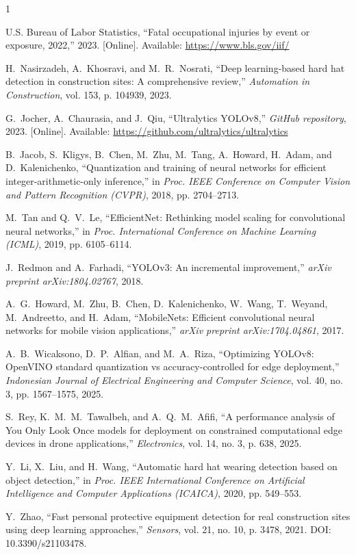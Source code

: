 \documentclass[conference,a4paper]{IEEEtran}
\begin{document}
\begin{thebibliography}{1}

U.S. Bureau of Labor Statistics, ``Fatal occupational injuries by event or exposure, 2022,'' 2023. [Online]. Available: \url{https://www.bls.gov/iif/}

H.~Nasirzadeh, A.~Khosravi, and M.~R.~Nosrati, ``Deep learning-based hard hat detection in construction sites: A comprehensive review,'' \emph{Automation in Construction}, vol. 153, p. 104939, 2023.

G.~Jocher, A.~Chaurasia, and J.~Qiu, ``Ultralytics YOLOv8,'' \emph{GitHub repository}, 2023. [Online]. Available: \url{https://github.com/ultralytics/ultralytics}

B.~Jacob, S.~Kligys, B.~Chen, M.~Zhu, M.~Tang, A.~Howard, H.~Adam, and D.~Kalenichenko, ``Quantization and training of neural networks for efficient integer-arithmetic-only inference,'' in \emph{Proc. IEEE Conference on Computer Vision and Pattern Recognition (CVPR)}, 2018, pp. 2704--2713.

M.~Tan and Q.~V.~Le, ``EfficientNet: Rethinking model scaling for convolutional neural networks,'' in \emph{Proc. International Conference on Machine Learning (ICML)}, 2019, pp. 6105--6114.

J.~Redmon and A.~Farhadi, ``YOLOv3: An incremental improvement,'' \emph{arXiv preprint arXiv:1804.02767}, 2018.

A.~G.~Howard, M.~Zhu, B.~Chen, D.~Kalenichenko, W.~Wang, T.~Weyand, M.~Andreetto, and H.~Adam, ``MobileNets: Efficient convolutional neural networks for mobile vision applications,'' \emph{arXiv preprint arXiv:1704.04861}, 2017.

A.~B.~Wicaksono, D.~P.~Alfian, and M.~A.~Riza, ``Optimizing YOLOv8: OpenVINO standard quantization vs accuracy-controlled for edge deployment,'' \emph{Indonesian Journal of Electrical Engineering and Computer Science}, vol. 40, no. 3, pp. 1567--1575, 2025.

S.~Rey, K.~M.~M.~Tawalbeh, and A.~Q.~M.~Afifi, ``A performance analysis of You Only Look Once models for deployment on constrained computational edge devices in drone applications,'' \emph{Electronics}, vol. 14, no. 3, p. 638, 2025.

Y.~Li, X.~Liu, and H.~Wang, ``Automatic hard hat wearing detection based on object detection,'' in \emph{Proc. IEEE International Conference on Artificial Intelligence and Computer Applications (ICAICA)}, 2020, pp. 549--553.

Y.~Zhao, ``Fast personal protective equipment detection for real construction sites using deep learning approaches,'' \emph{Sensors}, vol. 21, no. 10, p. 3478, 2021. DOI: 10.3390/s21103478.

\end{thebibliography}
\end{document}

